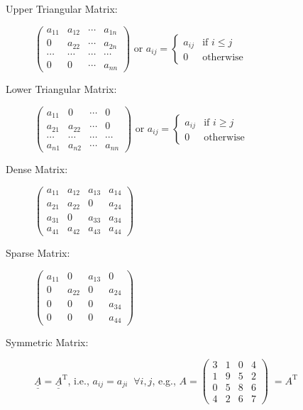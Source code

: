 \documentclass[12pts,a4paper,amsmath,amssymb,floatfix]{article}%
\renewcommand\leq{\leqslant}
\renewcommand\geq{\geqslant}
\begin{document}
\begin{description}
%
\item[Upper Triangular Matrix:] $\begin{pmatrix} a_{11} & a_{12} & \cdots & a_{1n} \\ 0 & a_{22} & \cdots & a_{2n} \\ \cdots & \cdots & \cdots & \cdots \\ 0 & 0 & \cdots & a_{nn}\end{pmatrix}$ or $a_{ij}  = \begin{cases} a_{ij} & \mbox{if } i\leq j \\0 & \mbox{otherwise} \end{cases}$
%
\item[Lower Triangular Matrix:] $\begin{pmatrix} a_{11} & 0 & \cdots & 0 \\ a_{21} & a_{22} & \cdots & 0 \\ \cdots & \cdots & \cdots & \cdots \\ a_{n1} & a_{n2} & \cdots & a_{nn}\end{pmatrix}$ or $a_{ij}  = \begin{cases} a_{ij} & \mbox{if } i\geq j \\0 & \mbox{otherwise} \end{cases}$
%
\item[Dense Matrix:] $\begin{pmatrix} a_{11} & a_{12} & a_{13} & a_{14} \\ a_{21} & a_{22} & 0 & a_{24} \\ a_{31} & 0 & a_{33} & a_{34} \\ a_{41} & a_{42} & a_{43} & a_{44}\end{pmatrix}$ 
%
\item[Sparse Matrix:] $\begin{pmatrix} a_{11} & 0  & a_{13} & 0 \\ 0 & a_{22} & 0 & a_{24} \\ 0 & 0 & 0 & a_{34} \\ 0 & 0 & 0 & a_{44}\end{pmatrix}$ 
%
\item[Symmetric Matrix:] $\underline{\underline{A}} = \underline{\underline{A}}^{\text{T}}$, i.e., $a_{ij}=a_{ji}\;\;\forall i,j$, e.g.,
$A=\begin{pmatrix} 3 & 1 & 0 & 4 \\ 1 & 9 & 5 & 2 \\ 0 & 5 & 8 & 6 \\ 4 & 2 & 6 & 7 \end{pmatrix}\;= A^{\text{T}}$
\end{description}  
\end{document}
